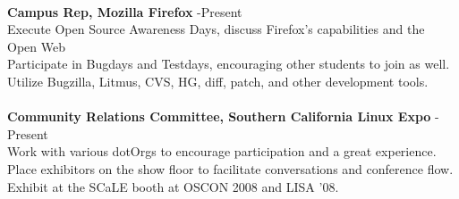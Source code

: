\documentclass{res}
\begin{document}
\begin{resume}
\begin{tabbing}
\\

    {\bf Campus Rep, Mozilla Firefox} \> -Present\\
	 Execute Open Source Awareness Days, discuss Firefox's capabilities and the Open Web \\
	 Participate in Bugdays and Testdays, encouraging other students to join as well. \\
	 Utilize Bugzilla, Litmus, CVS, HG, diff, patch, and other development tools.\\

\\

    {\bf Community Relations Committee, Southern California Linux Expo} \> -Present\\
	 Work with various dotOrgs to encourage participation and a great experience.\\
	 Place exhibitors on the show floor to facilitate conversations and conference flow.\\
	 Exhibit at the SCaLE booth at OSCON 2008 and LISA '08.
	 \end{tabbing}

\end{resume}
\end{document}
